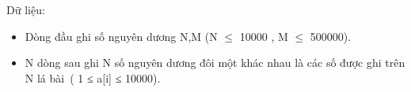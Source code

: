 Dữ liệu:
 
\begin{itemize}
	\item Dòng đầu ghi số nguyên dương N,M (N $\le$ 10000 , M $\le$ 500000).
	\item N dòng sau ghi N số nguyên dương đôi một khác nhau là các số được ghi trên N lá bài ( 1 ≤ a[i] ≤ 10000).
\end{itemize}

 